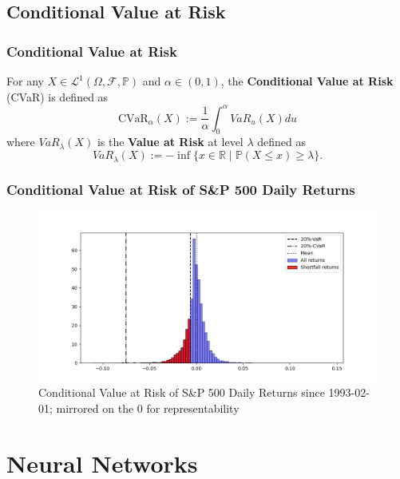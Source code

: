 \documentclass[serif]{beamer}
\def\R{{\mathbb R}}
\def\P{{\mathbb P}}
\def\O{{\Omega}}
\def\cF{{\mathcal F}}
\def\L{{\mathcal L}}
\begin{document}
\subsection{Conditional Value at Risk}

\begin{frame}
    \frametitle{Conditional Value at Risk}
    \begin{definition}
        For any $X \in \L^1 (\O, \cF, \P)$ and $\alpha \in (0,1)$,
        the \textbf{Conditional Value at Risk} (CVaR)
        is defined as
        $$\text{CVaR}_\alpha (X) := \frac{1}{\alpha} \int_0^\alpha VaR_u (X) du$$
        where $VaR_\lambda (X)$ is the \textbf{Value at Risk} at level $\lambda$ defined as
        $$VaR_\lambda (X) := - \inf \{ x \in \R \; | \; \P (X \leq x) \geq \lambda \}.$$
    \end{definition}
\end{frame}

\begin{frame}
    \frametitle{Conditional Value at Risk of S\&P 500 Daily Returns}
    \begin{figure}
        \includegraphics[width=1.0\textwidth]{./images/cvar_sp500_example.png}
        \caption{Conditional Value at Risk of S\&P 500 Daily Returns since 1993-02-01;
            mirrored on the $0$ for representability
        }
    \end{figure}
\end{frame}

\section{Neural Networks}
\end{document}
